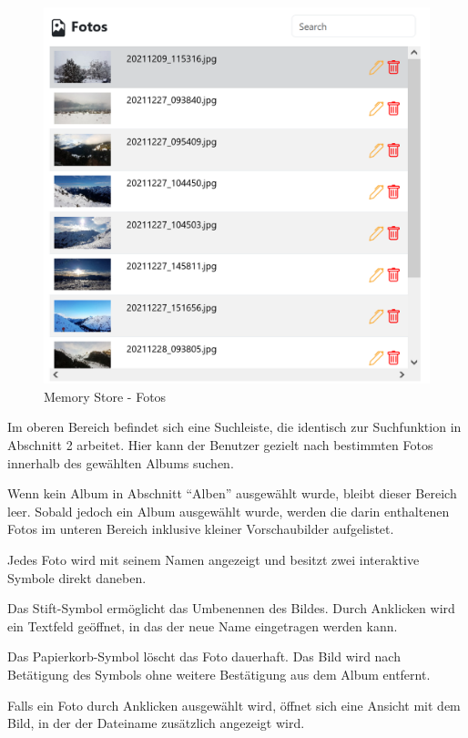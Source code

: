 \begin{figure} [h t]
    \centering
    \includegraphics[scale=0.7]{pics/memory_store_teil3.PNG}
    \caption{Memory Store - Fotos}
    \label{fig:memory-store-fotos}
\end{figure}

Im oberen Bereich befindet sich eine Suchleiste, die identisch zur Suchfunktion in Abschnitt 2 arbeitet. Hier kann der Benutzer gezielt nach bestimmten Fotos innerhalb des gewählten Albums suchen.

Wenn kein Album in Abschnitt ``Alben'' ausgewählt wurde, bleibt dieser Bereich leer. Sobald jedoch ein Album ausgewählt wurde, werden die darin enthaltenen Fotos im unteren Bereich inklusive kleiner Vorschaubilder aufgelistet.

Jedes Foto wird mit seinem Namen angezeigt und besitzt zwei interaktive Symbole direkt daneben.

Das Stift-Symbol ermöglicht das Umbenennen des Bildes. Durch Anklicken wird ein Textfeld geöffnet, in das der neue Name eingetragen werden kann.

Das Papierkorb-Symbol löscht das Foto dauerhaft. Das Bild wird nach Betätigung des Symbols ohne weitere Bestätigung aus dem Album entfernt.

Falls ein Foto durch Anklicken ausgewählt wird, öffnet sich eine Ansicht mit dem Bild, in der der Dateiname zusätzlich angezeigt wird. 

